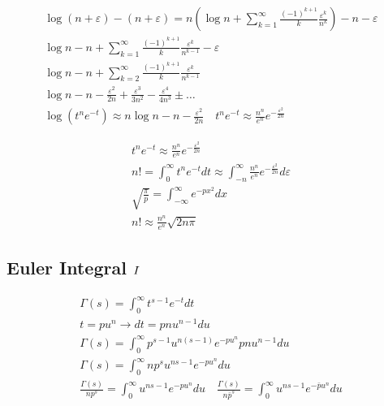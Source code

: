	$$
	\begin{gathered}
		\log (n+\varepsilon)-(n+\varepsilon)=n\left(\log n+\sum_{k=1}^{\infty} \frac{(-1)^{k+1}}{k} \frac{\varepsilon^k}{n^k}\right)-n-\varepsilon \\
		\log n-n+\sum_{k=1}^{\infty} \frac{(-1)^{k+1}}{k} \frac{\varepsilon^k}{n^{k-1}}-\varepsilon \\
		\log n-n+\sum_{k=2}^{\infty} \frac{(-1)^{k+1}}{k} \frac{\varepsilon^k}{n^{k-1}} \\
		\log n-n-\frac{\varepsilon^2}{2 n}+\frac{\varepsilon^3}{3 n^2}-\frac{\varepsilon^4}{4 n^3} \pm \ldots \\
		\log \left(t^n e^{-t}\right) \approx n \log n-n-\frac{\varepsilon^2}{2 n} \quad t^n e^{-t} \approx \frac{n^n}{e^n} e^{-\frac{\varepsilon^2}{2 n}}
	\end{gathered}
	$$
	
	$$
	\begin{gathered}
		t^n e^{-t} \approx \frac{n^n}{e^n} e^{-\frac{\varepsilon^2}{2 n}} \\
		n !=\int_0^{\infty} t^n e^{-t} d t \approx \int_{-n}^{\infty} \frac{n^n}{e^n} e^{-\frac{\varepsilon^2}{2 n}} d \varepsilon \\
		\sqrt{\frac{\pi}{p}}=\int_{-\infty}^{\infty} e^{-p x^2} d x  \\
		n ! \approx \frac{n^n}{e^n} \sqrt{2 n \pi}
	\end{gathered}
	$$
	
	
	\subsection{Euler Integral $\RNumb{1}$}
	
	$$
	\begin{gathered}
		\Gamma(s)=\int_0^\infty t^{s-1} e^{-t} d t \\
		t=p u^n \rightarrow d t=p n u^{n-1} d u \\
		\Gamma(s)=\int_0^{\infty} p^{s-1} u^{n(s-1)} e^{-p u^n} p n u^{n-1} d u \\
		\Gamma(s)=\int_0^{\infty} n p^s u^{n s-1} e^{-p u^n} d u \\
		\frac{\Gamma(s)}{n p^s}=\int_0^{\infty} u^{n s-1} e^{-p u^n} d u \quad \frac{\Gamma(s)}{n \bar{p}^s}=\int_0^{\infty} u^{n s-1} e^{-\bar{p} u^n} d u
	\end{gathered}
	$$
	
